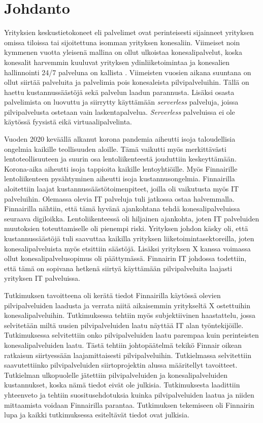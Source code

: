 \chapter{Johdanto\label{johdanto}}
Yrityksien keskustietokoneet eli palvelimet ovat perinteisesti sijainneet yrityksen omissa tiloissa tai sijoitettuna isomman yrityksen konesaliin. Viimeiset noin kymmenen vuotta yleisenä mallina on ollut ulkoistaa konesalipalvelut, koska konesalit harvemmin kuuluvat yrityksen ydinliiketoimintaa ja konesalien hallinnointi 24/7 palveluna on kallista \citep{data_center_outsourcing}. Viimeisten vuosien aikana suuntana on ollut siirtää palveluita ja palvelimia pois konesaleista pilvipalveluihin. Tällä on haettu kustannussäästöjä sekä palvelun laadun parannusta. Lisäksi osasta palvelimista on luovuttu ja siirrytty käyttämään \emph{serverless} palveluja, joissa pilvipalvelusta ostetaan vain laskentapalvelua. \emph{Serverless} palveluissa ei ole käytössä fyysistä eikä virtuaalipalvelinta. \citep{serverless_computing}


Vuoden 2020 keväällä alkanut korona pandemia aiheutti isoja taloudellisia ongelmia kaikille teollisuuden aloille. Tämä vaikutti myös merkittävästi lentoteollisuuteen ja suurin osa lentoliikenteestä jouduttiin keskeyttämään. Korona-aika aiheutti isoja tappioita kaikille lentoyhtiöille. Myös Finnairille lentoliikenteen pysähtyminen aiheutti isoja kustannusongelmia. Finnairilla aloitettiin laajat kustannussäästötoimenpiteet, joilla oli vaikutusta myös IT palveluihin. Olemassa olevia IT palveluja tuli jatkossa ostaa halvemmalla. Finnairilla nähtiin, että tämä hyvänä ajankohtana tehdä konesalipalveluissa seuraava digiloikka. Lentoliikenteessä oli hiljainen ajankohta, joten IT palveluiden muutoksien toteuttamiselle oli pienempi riski. Yrityksen johdon käsky oli, että kustannussäästöjä tuli saavuttaa kaikilla yrityksen liiketoimintasektoreilla, joten konesalipalveluista myös etsittiin säästöjä. Lisäksi yrityksen X kanssa voimassa ollut konesalipalvelusopimus oli päättymässä. Finnairin IT johdossa todettiin, että tämä on sopivana hetkenä siirtyä käyttämään pilvipalveluita laajasti yrityksen IT palveluissa. \citep{finnair_use_ibm}

Tutkimuksen tavoitteena oli kerätä tiedot Finnairilla käytössä olevien pilvipalveluiden laadusta ja verrata niitä aikaisemmin yritykseltä X ostettuihin konesalipalveluihin. Tutkimuksessa tehtiin myös subjektiivinen haastattelu, jossa selvitetään miltä uusien pilvipalveluiden laatu näyttää IT alan työntekijöille. Tutkimuksessa selvitettiin onko pilvipalveluiden laatu parempaa kuin perinteisten konesalipalveluiden laatu. Tästä tehtiin johtopäätelmä tekikö Finnair oikean ratkaisun siirtyessään laajamittaisesti pilvipalveluihin. Tutkielmassa selvitettiin saavutettiinko pilvipalveluiden siirtoprojektin alussa määritellyt tavoitteet. Tutkielman ulkopuolelle jätettiin pilvipalveluiden ja konesalipalveluiden kustannukset, koska nämä tiedot eivät ole julkisia. Tutkimuksesta laadittiin yhteenveto ja tehtiin suositusehdotuksia kuinka pilvipalveluiden laatua ja niiden mittaamista voidaan Finnairilla parantaa. Tutkimuksen tekemiseen oli Finnairin lupa ja kaikki tutkimuksessa esiteltävät tiedot ovat julkisia.

